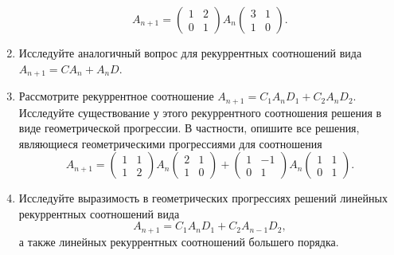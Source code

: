 \begin{enumerate}
$$A_{n+1}=\left(\begin{smallmatrix} 1&2\\ 0&1 \end{smallmatrix}\right) A_n \left(\begin{smallmatrix} 3&1\\ 1&0 \end{smallmatrix}\right).$$
\item Исследуйте аналогичный вопрос для рекуррентных соотношений вида $A_{n+1}=CA_n+A_nD$.
\item Рассмотрите рекуррентное соотношение $A_{n+1}=C_1A_nD_1+C_2A_nD_2$. Исследуйте существование у этого рекуррентного соотношения решения в виде геометрической прогрессии. В частности, опишите все решения, являющиеся геометрическими прогрессиями для соотношения 
$$A_{n+1}=\left(\begin{smallmatrix} 1&1\\ 1&2 \end{smallmatrix}\right) A_n \left(\begin{smallmatrix} 2&1\\ 1&0 \end{smallmatrix}\right) + \left(\begin{smallmatrix} 1&-1\\ 0&1 \end{smallmatrix}\right) A_n \left(\begin{smallmatrix} 1&1\\ 0&1 \end{smallmatrix}\right).$$
\item Исследуйте выразимость в геометрических прогрессиях  решений линейных рекуррентных соотношений вида
$$A_{n+1}=C_1A_nD_1+ C_2 A_{n-1}D_2,$$
а также линейных рекуррентных соотношений большего порядка.
\end{enumerate}




